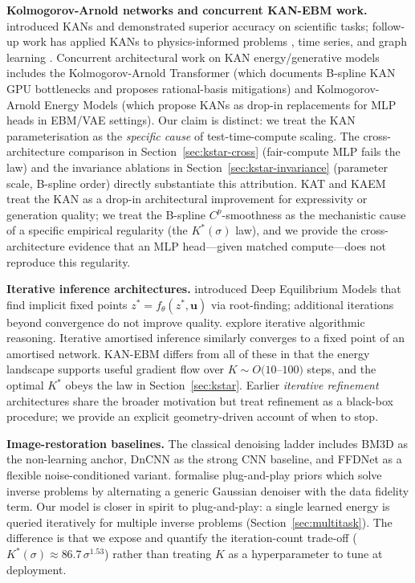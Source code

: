 \documentclass{article}
\newcommand{\uu}{\mathbf{u}}
\begin{document}
\textbf{Kolmogorov-Arnold networks and concurrent KAN-EBM work.}
\citet{liu2024kan} introduced KANs and demonstrated superior accuracy on
scientific tasks; follow-up work has applied KANs to physics-informed
problems \citep{shukla2024physicsinformed}, time series, and graph learning
\citep{kiamari2024gkan}. Concurrent architectural work on KAN energy/generative
models includes the Kolmogorov-Arnold Transformer \citep{kat2024} (which
documents B-spline KAN GPU bottlenecks and proposes rational-basis mitigations)
and Kolmogorov-Arnold Energy Models \citep{kaem2024} (which propose KANs as
drop-in replacements for MLP heads in EBM/VAE settings). Our claim is
distinct: we treat the KAN parameterisation as the \emph{specific cause} of
test-time-compute scaling. The cross-architecture comparison in
Section~\ref{sec:kstar-cross} (fair-compute MLP fails the law) and the
invariance ablations in Section~\ref{sec:kstar-invariance} (parameter scale,
B-spline order) directly substantiate this attribution.
KAT and KAEM treat the KAN as a drop-in architectural improvement for
expressivity or generation quality; we treat the B-spline $C^p$-smoothness
as the mechanistic cause of a specific empirical regularity (the
$K^{*}(\sigma)$ law), and we provide the cross-architecture evidence that
an MLP head---given matched compute---does not reproduce this regularity.

\textbf{Iterative inference architectures.} \citet{bai2019deq,bai2020mdeq}
introduced Deep Equilibrium Models that find implicit fixed points $z^{*} =
f_\theta(z^{*},\uu)$ via root-finding; additional iterations beyond
convergence do not improve quality. \citet{anil2022learn} explore iterative
algorithmic reasoning. Iterative amortised inference
\citep{marino2018iterative} similarly converges to a fixed point of an
amortised network. KAN-EBM differs from all of these in that the energy
landscape supports useful gradient flow over $K \sim O(10$--$100)$ steps,
and the optimal $K^{*}$ obeys the law in Section~\ref{sec:kstar}. Earlier
\emph{iterative refinement} architectures
\citep{batra2018reasoning,kirsch2022iterative} share the broader motivation
but treat refinement as a black-box procedure; we provide an explicit
geometry-driven account of when to stop.

\textbf{Image-restoration baselines.} The classical denoising
ladder includes BM3D \citep{dabov2007} as the non-learning anchor, DnCNN
\citep{zhang2017} as the strong CNN baseline, and FFDNet
\citep{zhang2018ffdnet} as a flexible noise-conditioned variant.
\citet{zhang2021plugandplay} formalise plug-and-play priors which solve
inverse problems by alternating a generic Gaussian denoiser with the data
fidelity term. Our model is closer in spirit to plug-and-play: a single
learned energy is queried iteratively for multiple inverse problems
(Section~\ref{sec:multitask}). The difference is that we expose and
quantify the iteration-count trade-off
($K^{*}(\sigma) \approx 86.7\,\sigma^{1.53}$) rather than treating $K$ as a
hyperparameter to tune at deployment.
\end{document}
